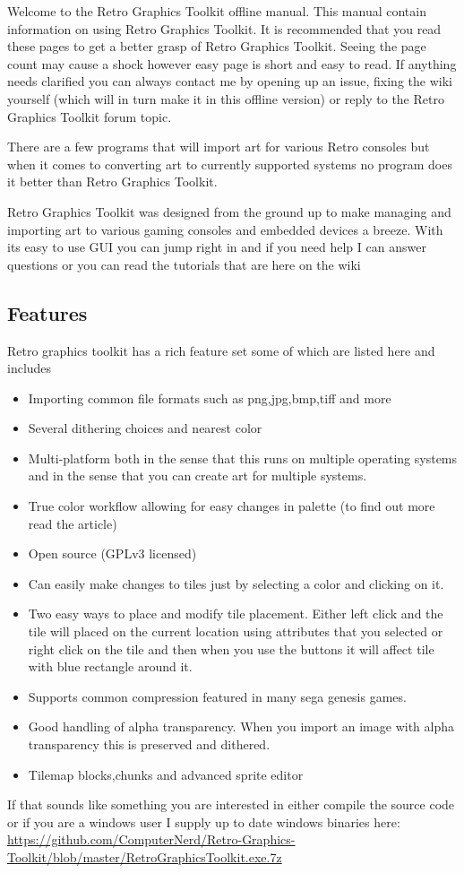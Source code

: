 Welcome to the Retro Graphics Toolkit offline manual. This manual contain
information on using Retro Graphics Toolkit. It is recommended that you
read these pages to get a better grasp of Retro Graphics Toolkit.
Seeing the page count may cause a shock however easy page is short and easy to read.
If anything needs clarified you can always contact me by opening
up an issue, fixing the wiki yourself (which will in turn make it in this offline version) or reply to the Retro Graphics
Toolkit forum topic.

There are a few programs that will import art for various Retro consoles
but when it comes to converting art to currently supported systems no
program does it better than Retro Graphics Toolkit.

Retro Graphics Toolkit was designed from the ground up to make managing
and importing art to various gaming consoles and embedded devices a
breeze. With its easy to use GUI you can jump right in and if you need
help I can answer questions or you can read the tutorials that are here
on the wiki

\subsection{Features}\label{features}

Retro graphics toolkit has a rich feature set some of which are listed
here and includes

\begin{itemize}
\itemsep1pt\parskip0pt
\item
  Importing common file formats such as png,jpg,bmp,tiff and more
\item
  Several dithering choices and nearest color
\item
  Multi-platform both in the sense that this runs on multiple operating
  systems and in the sense that you can create art for multiple
  systems.
\item
  True color workflow allowing for easy changes in palette (to find out
  more read the article)
\item
  Open source (GPLv3 licensed)
\item
  Can easily make changes to tiles just by selecting a color and
  clicking on it.
\item
  Two easy ways to place and modify tile placement. Either left click
  and the tile will placed on the current location using attributes that
  you selected or right click on the tile and then when you use the
  buttons it will affect tile with blue rectangle around it.
\item
  Supports common compression featured in many sega genesis games.
\item
  Good handling of alpha transparency. When you import an image with
  alpha transparency this is preserved and dithered.
\item
  Tilemap blocks,chunks and advanced sprite editor
\end{itemize}

If that sounds like something you are interested in either compile the
source code or if you are a windows user I supply up to date windows
binaries here:
\url{https://github.com/ComputerNerd/Retro-Graphics-Toolkit/blob/master/RetroGraphicsToolkit.exe.7z}
